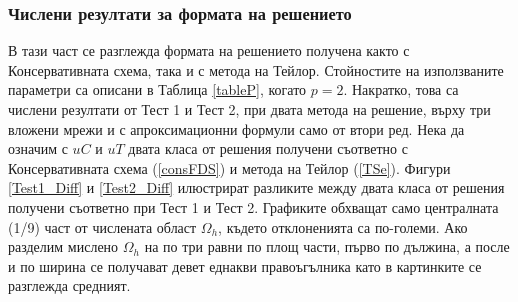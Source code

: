 \documentclass[a4paper]{article}
\newcommand{\rf}[1]{(\ref{#1})}
\theoremstyle{remark}
\begin{document}
\subsubsection{Числени резултати за формата на решението}
В тази част се разглежда формата на решението получена както с Консервативната схема, така и с метода на Тейлор. Стойностите на използваните параметри са описани в Таблица \ref{tableP}, когато $p=2$. Накратко, това са числени резултати от Тест 1 и Тест 2, при двата метода на решение, върху три вложени мрежи и с апроксимационни формули само от втори ред. Нека да означим с $uC$ и $uT$ двата класа от решения получени съответно с Консервативната схема \rf{consFDS} и метода на Тейлор \rf{TSe}. 
Фигури \ref{Test1_Diff} и \ref{Test2_Diff} илюстрират разликите между двата класа от решения получени съответно при Тест 1 и Тест 2. Графиките обхващат само централната (1/9) част от числената област $\Omega_h$, където отклоненията са по-големи. Ако разделим мислено $\Omega_h$ на по три равни по площ части, първо по дължина, а после и по ширина се получават девет еднакви правоъгълника като в картинките се разглежда средният.
\end{document}

